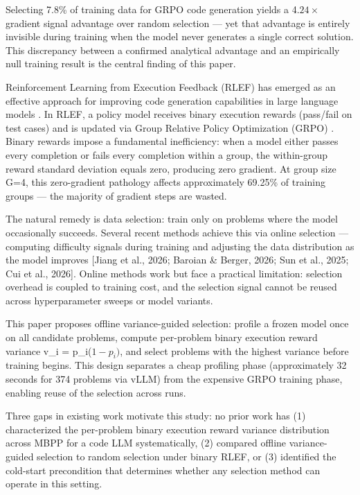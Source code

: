
Selecting 7.8\% of training data for GRPO code generation yields a 4.$24\times$ gradient signal advantage over random selection --- yet that advantage is entirely invisible during training when the model never generates a single correct solution. This discrepancy between a confirmed analytical advantage and an empirically null training result is the central finding of this paper.

Reinforcement Learning from Execution Feedback (RLEF) has emerged as an effective approach for improving code generation capabilities in large language models \citep{Gehring2024}. In RLEF, a policy model receives binary execution rewards (pass/fail on test cases) and is updated via Group Relative Policy Optimization (GRPO) \citep{Shao2024}. Binary rewards impose a fundamental inefficiency: when a model either passes every completion or fails every completion within a group, the within-group reward standard deviation equals zero, producing zero gradient. At group size G=4, this zero-gradient pathology affects approximately 69.25\% of training groups \citep{Nie2026} --- the majority of gradient steps are wasted.

The natural remedy is data selection: train only on problems where the model occasionally succeeds. Several recent methods achieve this via online selection --- computing difficulty signals during training and adjusting the data distribution as the model improves [Jiang et al., 2026; Baroian \& Berger, 2026; Sun et al., 2025; Cui et al., 2026]. Online methods work but face a practical limitation: selection overhead is coupled to training cost, and the selection signal cannot be reused across hyperparameter sweeps or model variants.

This paper proposes offline variance-guided selection: profile a frozen model once on all candidate problems, compute per-problem binary execution reward variance v\_i = p\_i($1-p_{i})$, and select problems with the highest variance before training begins. This design separates a cheap profiling phase (approximately 32 seconds for 374 problems via vLLM) from the expensive GRPO training phase, enabling reuse of the selection across runs.

Three gaps in existing work motivate this study: no prior work has (1) characterized the per-problem binary execution reward variance distribution across MBPP for a code LLM systematically, (2) compared offline variance-guided selection to random selection under binary RLEF, or (3) identified the cold-start precondition that determines whether any selection method can operate in this setting.

